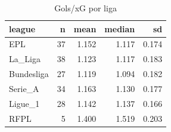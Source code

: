 \begin{table}

\caption{\label{tab:gols_xg_liga_g20}Gols/xG por liga}
\centering
\begin{tabular}[t]{lrrrr}
\toprule
league & n & mean & median & sd\\
\midrule
EPL & 37 & 1.152 & 1.117 & 0.174\\
La\_Liga & 38 & 1.123 & 1.117 & 0.183\\
Bundesliga & 27 & 1.119 & 1.094 & 0.182\\
Serie\_A & 34 & 1.163 & 1.130 & 0.177\\
Ligue\_1 & 28 & 1.142 & 1.137 & 0.166\\
\addlinespace
RFPL & 5 & 1.400 & 1.519 & 0.203\\
\bottomrule
\end{tabular}
\end{table}
